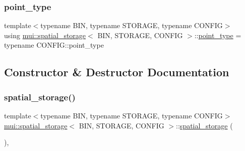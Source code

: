 \subsubsection{\texorpdfstring{point\+\_\+type}{point\_type}}
{\footnotesize\ttfamily template$<$typename B\+IN, typename S\+T\+O\+R\+A\+GE, typename C\+O\+N\+F\+IG$>$ \\
using \hyperlink{classmui_1_1spatial__storage}{mui\+::spatial\+\_\+storage}$<$ B\+IN, S\+T\+O\+R\+A\+GE, C\+O\+N\+F\+IG $>$\+::\hyperlink{classmui_1_1spatial__storage_a29c9b70a3becee947f2ffa55264d8fde}{point\+\_\+type} =  typename C\+O\+N\+F\+I\+G\+::point\+\_\+type}



\subsection{Constructor \& Destructor Documentation}
\mbox{\label{classmui_1_1spatial__storage_af0eec3fcfc27ae97839edd4a23bc0169}} 
\subsubsection{\texorpdfstring{spatial\+\_\+storage()}{spatial\_storage()}\hspace{0.1cm}{\footnotesize\ttfamily [1/4]}}
{\footnotesize\ttfamily template$<$typename B\+IN, typename S\+T\+O\+R\+A\+GE, typename C\+O\+N\+F\+IG$>$ \\
\hyperlink{classmui_1_1spatial__storage}{mui\+::spatial\+\_\+storage}$<$ B\+IN, S\+T\+O\+R\+A\+GE, C\+O\+N\+F\+IG $>$\+::\hyperlink{classmui_1_1spatial__storage}{spatial\+\_\+storage} (\begin{DoxyParamCaption}{ }\end{DoxyParamCaption})\hspace{0.3cm}{\ttfamily [inline]}, {\ttfamily [noexcept]}}

\mbox{\label{classmui_1_1spatial__storage_a524b87e9a430bcdf8f9437ebe4c1d642}} 
